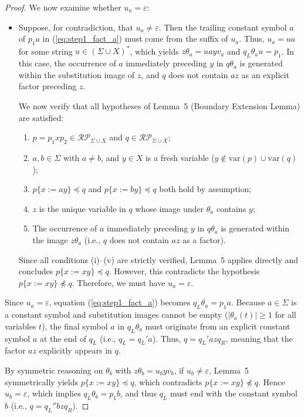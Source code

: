{\begin{proof}
We now examine whether $u_a = \varepsilon$:
\begin{itemize}
    \item Suppose, for contradiction, that $u_a \neq \varepsilon$. Then the trailing constant symbol $a$ of $p_1 a$ in (\ref{eq:step1_fact_a}) must come from the suffix of $u_a$. Thus, $u_a = ua$ for some string $u \in (\Sigma \cup X)^*$, which yields $z\theta_a = u a y v_a$ and $q_L\theta_a u = p_1$.
    In this case, the occurrence of $a$ immediately preceding $y$ in $q\theta_a$ is generated within the substitution image of $z$, and $q$ does not contain $az$ as an explicit factor preceding $z$.
    
    We now verify that all hypotheses of Lemma~5 (Boundary Extension Lemma) are satisfied:
    \begin{enumerate}
        \item[(i)] $p = p_1 x p_2 \in \mathcal{RP}_{\Sigma \cup X}$ and $q \in \mathcal{RP}_{\Sigma \cup X}$;
        \item[(ii)] $a, b \in \Sigma$ with $a \neq b$, and $y \in X$ is a fresh variable ($y \notin \mathrm{var}(p) \cup \mathrm{var}(q)$);
        \item[(iii)] $p\{x := ay\} \preceq q$ and $p\{x := by\} \preceq q$ both hold by assumption;
        \item[(iv)] $z$ is the unique variable in $q$ whose image under $\theta_a$ contains $y$;
        \item[(v)] The occurrence of $a$ immediately preceding $y$ in $q\theta_a$ is generated within the image $z\theta_a$ (i.e., $q$ does not contain $az$ as a factor).
    \end{enumerate}
    Since all conditions (i)--(v) are strictly verified, Lemma~5 applies directly and concludes $p\{x := xy\} \preceq q$. However, this contradicts the hypothesis $p\{x := xy\} \not\preceq q$.
    Therefore, we must have $u_a = \varepsilon$.
\end{itemize}

Since $u_a = \varepsilon$, equation (\ref{eq:step1_fact_a}) becomes $q_L\theta_a = p_1 a$. Because $a \in \Sigma$ is a constant symbol and substitution images cannot be empty ($|\theta_a(t)| \ge 1$ for all variables $t$), the final symbol $a$ in $q_L\theta_a$ must originate from an explicit constant symbol $a$ at the end of $q_L$ (i.e., $q_L = q_L' a$). Thus, $q = q_L' a z q_R$, meaning that the factor $az$ explicitly appears in $q$.

By symmetric reasoning on $\theta_b$ with $z\theta_b = u_b y v_b$, if $u_b \neq \varepsilon$, Lemma~5 symmetrically yields $p\{x := xy\} \preceq q$, which contradicts $p\{x := xy\} \not\preceq q$. Hence $u_b = \varepsilon$, which implies $q_L\theta_b = p_1 b$, and thus $q_L$ must end with the constant symbol $b$ (i.e., $q = q_L'' b z q_R$).


\end{proof}}
